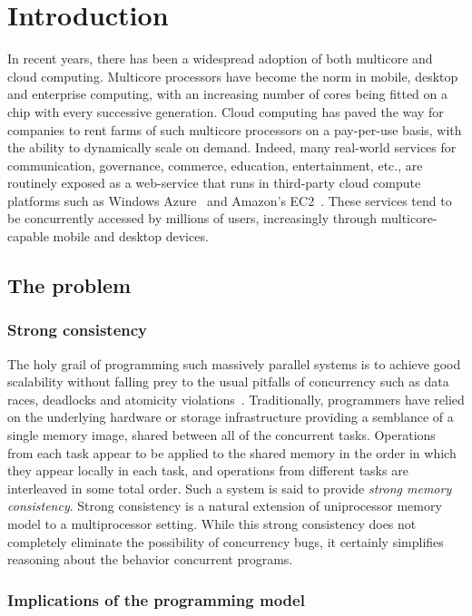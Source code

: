 \chapter{Introduction}

In recent years, there has been a widespread adoption of both multicore and
cloud computing. Multicore processors have become the norm in mobile, desktop
and enterprise computing, with an increasing number of cores being fitted on a
chip with every successive generation. Cloud computing has paved the way for
companies to rent farms of such multicore processors on a pay-per-use basis,
with the ability to dynamically scale on demand. Indeed, many real-world
services for communication, governance, commerce, education, entertainment,
etc., are routinely exposed as a web-service that runs in third-party cloud
compute platforms such as Windows Azure~\cite{Calder2011} and Amazon’s
EC2~\cite{EC2}. These services tend to be concurrently accessed by millions of
users, increasingly through multicore-capable mobile and desktop devices.

\section{The problem}

\subsection{Strong consistency}

The holy grail of programming such massively parallel systems is to achieve
good scalability without falling prey to the usual pitfalls of concurrency such
as data races, deadlocks and atomicity violations~\cite{Lu2008}. Traditionally,
programmers have relied on the underlying hardware or storage infrastructure
providing a semblance of a single memory image, shared between all of the
concurrent tasks. Operations from each task appear to be applied to the shared
memory in the order in which they appear locally in each task, and operations
from different tasks are interleaved in some total order. Such a system is said
to provide \emph{strong memory consistency}. Strong consistency is a natural
extension of uniprocessor memory model to a multiprocessor setting. While this
strong consistency does not completely eliminate the possibility of concurrency
bugs, it certainly simplifies reasoning about the behavior concurrent programs.

\subsection{Implications of the programming model}


